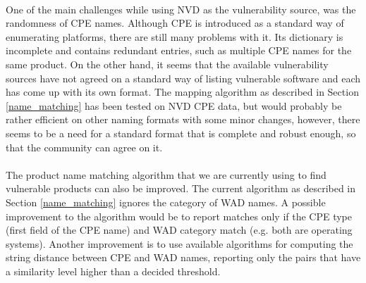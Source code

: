 \paragraph{}
One of the main challenges while using NVD as the vulnerability source, was the randomness of CPE names. Although CPE is introduced as a standard way of enumerating platforms, there are still many problems with it. Its dictionary is incomplete and contains redundant entries, such as multiple CPE names for the same product. On the other hand, it seems that the available vulnerability sources have not agreed on a standard way of listing vulnerable software and each has come up with its own format. The mapping algorithm as described in Section \ref{name_matching} has been tested on NVD CPE data, but would probably be rather efficient on other naming formats with some minor changes, however, there seems to be a need for a standard format that is complete and robust enough, so that the community can agree on it.

\paragraph{}
The product name matching algorithm that we are currently using to find vulnerable products can also be improved. The current algorithm as described in Section \ref{name_matching} ignores the category of WAD names. A possible improvement to the algorithm would be to report matches only if the CPE type (first field of the CPE name) and WAD category match (e.g. both are operating systems). Another improvement is to use available algorithms for computing the string distance between CPE and WAD names, reporting only the pairs that have a similarity level higher than a decided threshold.  
